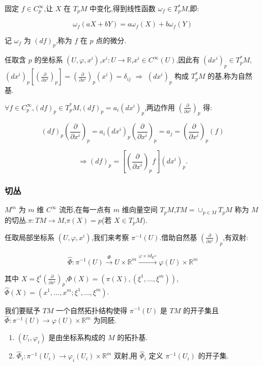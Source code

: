 固定 $f \in C_p^\infty$,让 $X$ 在 $T_pM$ 中变化,得到线性函数 $\omega_f \in T_p^*M$,即:

\[
\omega_f(aX + bY) = a\omega_f(X) + b\omega_f(Y)
\]

记 $\omega_f$ 为 $(df)_p$,称为 $f$ 在 $p$ 点的微分.

任取含 $p$ 的坐标系 $(U, \varphi, x^i)$,$x^i : U \rightarrow \mathbb{R}$,$x^i \in C^\infty(U)$,因此有 $(dx^i)_p \in T_p^*M$,$(dx^i)_p[(\frac{\partial}{\partial x^i})_p] = (\frac{\partial}{\partial x^i})_p(x^i) = \delta_{ij}$ $\Rightarrow$ $(dx^i)_p$ 构成 $T_p^*M$ 的基,称为自然基.

$\forall f \in C_p^\infty$,$(df)_p \in T_p^*M$,$(df)_p = a_i(dx^i)_p$,两边作用 $(\frac{\partial}{\partial x^i})_p$ 得:

\[
(df)_p(\frac{\partial}{\partial x^i})_p = a_i(dx^i)_p(\frac{\partial}{\partial x^i})_p = a_j = (\frac{\partial}{\partial x^i})_p(f)
\]

\[
\Rightarrow (df)_p = [(\frac{\partial}{\partial x^i})_p f](dx^i)_p.
\]

\subsubsection{切丛}

$M^m$ 为 $m$ 维 $C^\infty$ 流形,在每一点有 $m$ 维向量空间 $T_pM$,$TM = \cup_{p \in M} T_pM$ 称为 $M$ 的切丛.$\pi:TM \rightarrow M$,$\pi(X) = p$(若 $X \in T_pM$).

任取局部坐标系 $(U, \varphi, x^i)$,我们来考察 $\pi^{-1}(U)$.借助自然基 $(\frac{\partial}{\partial x^i})_p$,有双射:

\[
\hat{\Phi}: \pi^{-1}(U) \overset{\Phi}{\rightarrow} U \times \mathbb{R}^m \xrightarrow{\varphi \times id_{\mathbb{R}^m}} \varphi(U) \times \mathbb{R}^m
\]

其中 $X = \xi^i(\frac{\partial}{\partial x^i})_p$,$\Phi(X) = (\pi(X), (\xi^1, \ldots, \xi^m))$,$\hat{\Phi}(X) = (x^1, \ldots, x^m; \xi^1, \ldots, \xi^m)$.

我们要赋予 $TM$ 一个自然拓扑结构使得 $\pi^{-1}(U)$ 是 $TM$ 的开子集且 $\hat{\Phi} : \pi^{-1}(U) \rightarrow \varphi(U) \times \mathbb{R}^m$ 为同胚.
\begin{enumerate}
    \item $(U_i, \varphi_i)$ 是由坐标系构成的 $M$ 的拓扑基.
    \item $\hat{\Phi}_i : \pi^{-1}(U_i) \rightarrow \varphi_i(U_i) \times \mathbb{R}^m$ 双射,用 $\hat{\Phi}_i$ 定义 $\pi^{-1}(U_i)$ 的开子集.
\end{enumerate}

